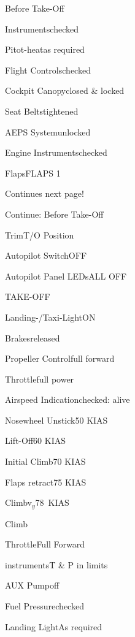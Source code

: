 \begin{checklist}{Before Take-Off}
  \item{Instruments}{checked}
  \item{Pitot-heat}{as required}
  \item{Flight Controls}{checked}
  \item{Cockpit Canopy}{closed \& locked}
  \item{Seat Belts}{tightened}
  \item{AEPS System}{unlocked}
  \item{Engine Instruments}{checked}
  \item{Flaps}{FLAPS 1}

Continues next page!
\end{checklist}
\begin{checklist}{Continue: Before Take-Off}
  \item{Trim}{T/O Position}
  \item{Autopilot Switch}{OFF}
  \item{Autopilot Panel LEDs}{ALL OFF}
\end{checklist}

\begin{checklist}{TAKE-OFF}
  \item{Landing-/Taxi-Light}{ON}
  \item{Brakes}{released}
  \item{Propeller Control}{full forward}
  \item{Throttle}{full power}
  \item{Airspeed Indication}{checked: alive}
  \item{Nosewheel Unstick}{50 KIAS}
  \item{Lift-Off}{60 KIAS}
  \item{Initial Climb}{70 KIAS}
  \item{Flaps retract}{75 KIAS}
  \item{Climb}{v$_{y}$78~KIAS} 
\end{checklist}

\begin{checklist}{Climb}
  \item{Throttle}{Full Forward}
  \item{instruments}{T \& P in limits}
  \item{AUX Pump}{off}
  \item{Fuel Pressure}{checked}
  \item{Landing Light}{As required}
\end{checklist}

